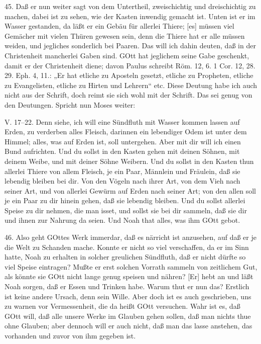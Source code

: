 45. Daß er nun weiter sagt von dem Untertheil, zweischichtig und dreischichtig zu machen, dabei ist zu sehen, wie der Kasten inwendig gemacht ist. Unten ist er im Wasser gestanden, da läßt er ein Gebäu für allerlei Thiere; [es] müssen viel Gemächer mit vielen Thüren gewesen sein, denn die Thiere hat er alle müssen weiden, und jegliches sonderlich bei Paaren. Das will ich dahin deuten, daß in der Christenheit mancherlei Gaben sind. GOtt hat jeglichem seine Gabe geschenkt, damit er der Christenheit diene; davon Paulus schreibt Röm. 12, 6. 1 Cor. 12, 28. 29. Eph. 4, 11.: „Er hat etliche zu Aposteln gesetzt, etliche zu Propheten, etliche zu Evangelisten, etliche zu Hirten und Lehrern“ etc. Diese Deutung habe ich auch nicht aus der Schrift, doch reimt sie sich wohl mit der Schrift. Das sei genug von den Deutungen. Spricht nun Moses weiter:

\begin{schriftzitat}
V. 17–22. Denn siehe, ich will eine Sündfluth mit Wasser kommen lassen auf Erden, zu verderben
alles Fleisch, darinnen ein lebendiger Odem ist unter dem Himmel; alles, was auf Erden ist, soll untergehen. Aber mit dir will ich einen Bund aufrichten. Und du sollst in den Kasten gehen mit deinen Söhnen, mit deinem Weibe, und mit deiner Söhne Weibern. Und du sollst in den Kasten thun allerlei Thiere von allem Fleisch, je ein Paar, Männlein und Fräulein, daß sie lebendig bleiben bei dir. Von den Vögeln nach ihrer Art, von dem Vieh nach seiner Art, und von allerlei Gewürm auf Erden nach seiner Art; von den allen soll je ein Paar zu dir hinein gehen, daß sie lebendig bleiben. Und du sollst allerlei Speise zu dir nehmen, die man isset, und sollst sie bei dir sammeln, daß sie dir und ihnen zur Nahrung da seien. Und Noah that alles, was ihm GOtt gebot.
\end{schriftzitat}

46. Also geht GOttes Werk immerdar, daß es närricht ist anzusehen, auf daß er je die Welt zu Schanden mache. Konnte er nicht so viel verschaffen, da er im Sinn hatte, Noah zu erhalten in solcher greulichen Sündfluth, daß er nicht dürfte so viel Speise eintragen? Mußte er erst solchen Vorrath sammeln von zeitlichem Gut, als könnte sie GOtt nicht lange genug speisen und nähren? [Er] hebt an und läßt Noah sorgen, daß er Essen und Trinken habe. Warum thut er nun das? Erstlich ist keine andere Ursach, denn sein Wille. Aber doch ist es auch geschrieben, uns zu warnen vor Vermessenheit, die da heißt GOtt versuchen. Wahr ist es, daß GOtt will, daß alle unsere Werke im Glauben gehen sollen, daß man nichts thue ohne Glauben; aber dennoch will er auch nicht, daß man das lasse anstehen, das vorhanden und zuvor von ihm gegeben ist.

